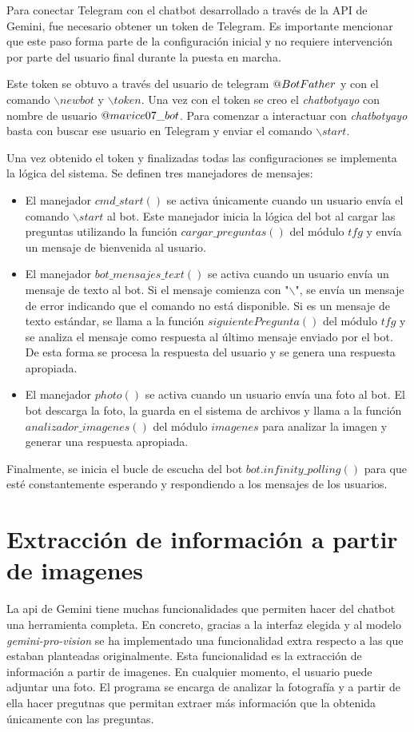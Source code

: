 Para conectar Telegram con el chatbot desarrollado a través de la API de Gemini, fue necesario obtener un token de Telegram. Es importante mencionar que este paso forma parte de la configuración inicial y no requiere intervención por parte del usuario final durante la puesta en marcha.

Este token se obtuvo a través del usuario de telegram $\makeatletter @ BotFather$ y con el comando $\backslash newbot$ y $\backslash token$. Una vez con el token se creo el \textit{chatbotyayo} con nombre de usuario $\makeatletter @ mavice07\_bot$. Para comenzar a interactuar con \textit{chatbotyayo} basta con buscar ese usuario en Telegram y enviar el comando $\backslash start$. 

Una vez obtenido el token y finalizadas todas las configuraciones se implementa la lógica del sistema. Se definen tres manejadores de mensajes:
	\begin{itemize}
		\item El manejador $cmd\_start()$ se activa únicamente cuando un usuario envía el comando $\backslash start$ al bot. Este manejador inicia la lógica del bot al cargar las preguntas utilizando la función $cargar\_preguntas()$ del módulo $tfg$ y envía un mensaje de bienvenida al usuario.
		
		\item El manejador $bot\_mensajes\_text()$ se activa cuando un usuario envía un mensaje de texto al bot. Si el mensaje comienza con "$\backslash$", se envía un mensaje de error indicando que el comando no está disponible. Si es un mensaje de texto estándar, se llama a la función $siguientePregunta()$ del módulo $tfg$ y se analiza el mensaje como respuesta al último mensaje enviado por el bot. De esta forma se procesa la respuesta del usuario y se genera una respuesta apropiada.
		
		\item El manejador $photo()$ se activa cuando un usuario envía una foto al bot. El bot descarga la foto, la guarda en el sistema de archivos y llama a la función $analizador\_imagenes()$ del módulo $imagenes$ para analizar la imagen y generar una respuesta apropiada.
	\end{itemize}
	
Finalmente, se inicia el bucle de escucha del bot $bot.infinity\_polling()$ para que esté constantemente esperando y respondiendo a los mensajes de los usuarios.


\section{Extracción de información a partir de imagenes}
\label{sec:imagenes}
La api de Gemini tiene muchas funcionalidades que permiten hacer del chatbot una herramienta completa. En concreto, gracias a la interfaz elegida y al modelo \textit{gemini-pro-vision} se ha implementado una funcionalidad extra respecto a las que estaban planteadas originalmente. Esta funcionalidad es la extracción de información a partir de imagenes. En cualquier momento, el usuario puede adjuntar una foto. El programa se encarga de analizar la fotografía y a partir de ella hacer pregutnas que permitan extraer más información que la obtenida únicamente con las preguntas.

